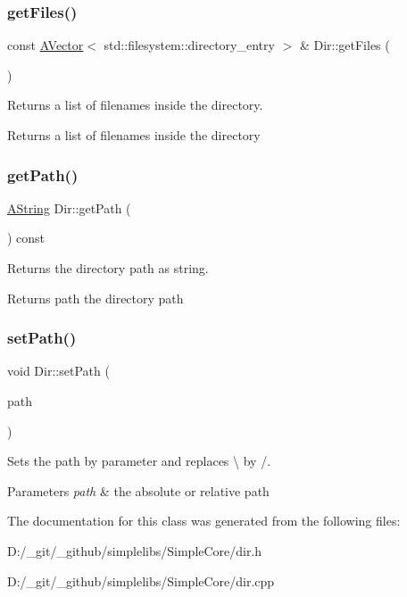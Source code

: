 \subsubsection{\texorpdfstring{getFiles()}{getFiles()}}
{\footnotesize\ttfamily const \mbox{\hyperlink{class_a_vector}{A\+Vector}}$<$ std\+::filesystem\+::directory\+\_\+entry $>$ \& Dir\+::get\+Files (\begin{DoxyParamCaption}{ }\end{DoxyParamCaption})}



Returns a list of filenames inside the directory. 

\begin{DoxyReturn}{Returns}
a list of filenames inside the directory 
\end{DoxyReturn}
\mbox{\label{class_dir_a000627e9787773619bccc3d4ef76a7ac}} 
\subsubsection{\texorpdfstring{getPath()}{getPath()}}
{\footnotesize\ttfamily \mbox{\hyperlink{class_a_string}{A\+String}} Dir\+::get\+Path (\begin{DoxyParamCaption}{ }\end{DoxyParamCaption}) const}



Returns the directory path as string. 

\begin{DoxyReturn}{Returns}
path the directory path 
\end{DoxyReturn}
\mbox{\label{class_dir_a08bb155c0d0ae5150997dedce31aa56f}} 
\subsubsection{\texorpdfstring{setPath()}{setPath()}}
{\footnotesize\ttfamily void Dir\+::set\+Path (\begin{DoxyParamCaption}\item[{const \mbox{\hyperlink{class_a_string}{A\+String}} \&}]{path }\end{DoxyParamCaption})}



Sets the path by parameter and replaces \textbackslash{} by /. 


\begin{DoxyParams}{Parameters}
{\em path} & the absolute or relative path \\
\hline
\end{DoxyParams}


The documentation for this class was generated from the following files\+:\begin{DoxyCompactItemize}
\item 
D\+:/\+\_\+git/\+\_\+github/simplelibs/\+Simple\+Core/dir.\+h\item 
D\+:/\+\_\+git/\+\_\+github/simplelibs/\+Simple\+Core/dir.\+cpp\end{DoxyCompactItemize}
